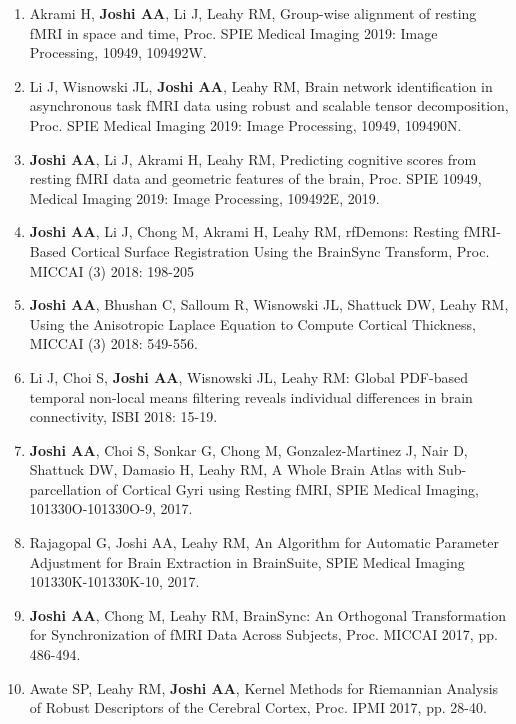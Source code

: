 \documentclass[overlapped,line,letterpaper]{res}
\begin{document}
\begin{resume}
\begin{enumerate}
    \item Akrami H, \textbf{Joshi AA}, Li J, Leahy RM, {Group-wise alignment of resting fMRI in space and time}, {Proc. SPIE Medical Imaging 2019}: Image Processing, 10949, 109492W.

    \item Li J, Wisnowski JL, \textbf{Joshi AA}, Leahy RM, {Brain network identification in asynchronous task fMRI data using robust and scalable tensor decomposition}, {Proc. SPIE Medical Imaging 2019}: Image Processing, 10949, 109490N. 

    \item \textbf{Joshi AA}, Li J, Akrami H, Leahy RM, {Predicting cognitive scores from resting fMRI data and geometric features of the brain}, {Proc. SPIE 10949, Medical Imaging 2019}: Image Processing, 109492E, 2019.
    
    \item \textbf{Joshi AA}, Li J, Chong M, Akrami H, Leahy RM, {rfDemons: Resting fMRI-Based Cortical Surface Registration Using the BrainSync Transform}, Proc. MICCAI (3) 2018: 198-205

    \item \textbf{Joshi AA}, Bhushan C, Salloum R, Wisnowski JL, Shattuck DW, Leahy RM, {Using the Anisotropic Laplace Equation to Compute Cortical Thickness}, MICCAI (3) 2018: 549-556. 

    \item Li J, Choi S, \textbf{Joshi AA}, Wisnowski JL, Leahy RM: {Global PDF-based temporal non-local means filtering reveals individual differences in brain connectivity},  ISBI 2018: 15-19.

    \item \textbf{Joshi AA}, Choi S, Sonkar G, Chong M,  Gonzalez-Martinez J, Nair D, Shattuck DW,  Damasio H, Leahy RM, {A Whole Brain Atlas with Sub-parcellation of Cortical Gyri using Resting fMRI}, SPIE Medical Imaging, 101330O-101330O-9, 2017.

    \item Rajagopal G, Joshi AA, Leahy RM, {An Algorithm for Automatic Parameter Adjustment for Brain Extraction in BrainSuite},  SPIE Medical Imaging 101330K-101330K-10, 2017.

    \item \textbf{Joshi AA}, Chong M, Leahy RM, {BrainSync: An Orthogonal Transformation for Synchronization of fMRI Data Across Subjects}, Proc. MICCAI 2017, pp. 486-494.

    \item Awate SP, Leahy RM, \textbf{Joshi AA}, {Kernel Methods for Riemannian Analysis of Robust Descriptors of the Cerebral Cortex}, Proc. IPMI 2017, pp. 28-40.


\end{enumerate}
\end{resume}
\end{document}
